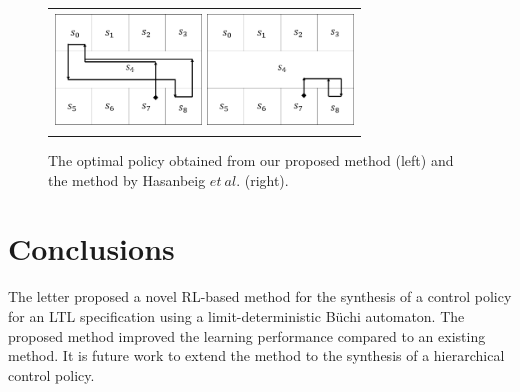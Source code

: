 \documentclass[letterpaper, 10 pt, conference]{ieeeconf}  %
\begin{document}
\begin{figure}[tbp]
	\centering
	\begin{tabular}{c}

		\begin{minipage}{0.499\hsize}
			\includegraphics[bb=0 0 341 256, height = 3.1cm, width=3.9cm]{proposed_policy.png}
		\end{minipage}

		\begin{minipage}{0.499\hsize}
			\centering
			\includegraphics[bb=0 0 341 257, height = 3.1cm, width=3.9cm]{Abate_policy.png}
		\end{minipage}
	\end{tabular}

	\caption{The optimal policy obtained from our proposed method (left) and the method by Hasanbeig $et\ al.$\cite{HAK2019} (right).}
	\label{optimal}
\end{figure}

\section{Conclusions}

The letter proposed a novel RL-based method for the synthesis of a control policy for an LTL specification using a limit-deterministic B\"{u}chi automaton.
The proposed method improved the learning performance compared to an existing method.
It is future work to extend the method to the synthesis of a hierarchical control policy.





\end{document}
